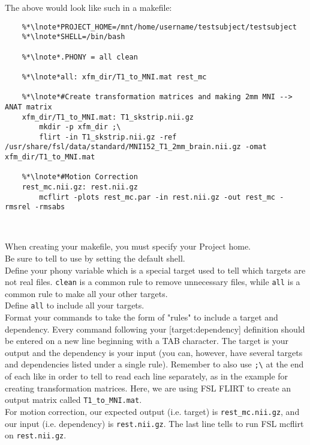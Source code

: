 The above would look like such in a makefile: %
\begin{lstlisting}
	%*\lnote*PROJECT_HOME=/mnt/home/username/testsubject/testsubject
	%*\lnote*SHELL=/bin/bash
	
	%*\lnote*.PHONY = all clean	
	
	%*\lnote*all: xfm_dir/T1_to_MNI.mat rest_mc

	%*\lnote*#Create transformation matrices and making 2mm MNI --> ANAT matrix
	xfm_dir/T1_to_MNI.mat: T1_skstrip.nii.gz 
		mkdir -p xfm_dir ;\
		flirt -in T1_skstrip.nii.gz -ref /usr/share/fsl/data/standard/MNI152_T1_2mm_brain.nii.gz -omat xfm_dir/T1_to_MNI.mat

	%*\lnote*#Motion Correction
	rest_mc.nii.gz: rest.nii.gz
		mcflirt -plots rest_mc.par -in rest.nii.gz -out rest_mc -rmsrel -rmsabs

	
\end{lstlisting}

When creating your makefile, you must specify your Project home. \\
\indent\lnum{4}Be sure to tell \maken{} to use \bashn{} by setting the default shell. \\
\indent\lnum{5}Define your phony variable which is a special target used to tell \maken{} which targets are not real files. \texttt{clean} is a common rule to remove unnecessary files, while \texttt{all} is a common rule to make all your other targets. \\
\indent\lnum{6}Define \texttt{all} to include all your targets. \\
\indent\lnum{7}Format your commands to take the form of "rules" to include a target and dependency. Every command following your [target:dependency] definition should be entered on a new line beginning with a TAB character. The target is your output and the dependency is your input (you can, however, have several targets and dependencies listed under a single rule). Remember to also use \texttt{;\textbackslash{}} at the end of each like in order to tell \maken{} to read each line separately, as in the example for creating transformation matrices. Here, we are using FSL FLIRT to create an output matrix called \texttt{T1_to_MNI.mat}. \\ 
\indent\lnum{8}For motion correction, our expected output (i.e. target) is \texttt{rest_mc.nii.gz}, and our input (i.e. dependency) is \texttt{rest.nii.gz}. The last line tells \maken{} to run FSL mcflirt on \texttt{rest.nii.gz}. 


